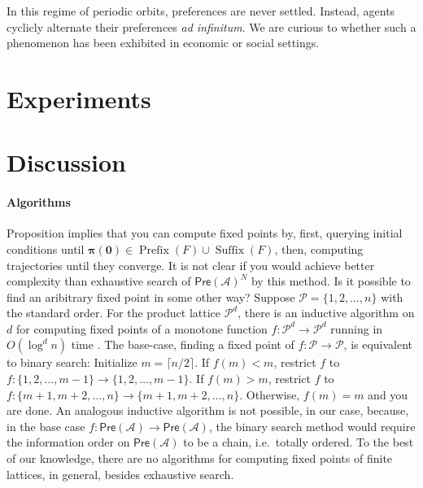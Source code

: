 \documentclass[conference]{ieeeconf}
\newcommand{\A}{\mathcal{A}}
\renewcommand{\P}{\mathcal{P}}
\newcommand{\Pref}{\mathsf{Pre}}
\DeclareMathOperator{\Pre}{Prefix}
\DeclareMathOperator{\Post}{Suffix}
\begin{document}
In this regime of periodic orbits, preferences are never settled. Instead, agents cyclicly alternate their preferences \emph{ad infinitum}. We are curious to whether such a phenomenon has been exhibited in economic or social settings.


\section{Experiments}
\label{sec:experiments}


\section{Discussion}
\label{sec:discussion}

\paragraph*{Algorithms}
Proposition \label{prop:initial-conditions} implies that you can compute fixed points by, first, querying initial conditions until $\boldsymbol{\pi(0)} \in \Pre(F) \cup \Post(F)$, then, computing trajectories until they converge. It is not clear if you would achieve better complexity than exhaustive search of $\Pref(\A)^N$ by this method. Is it possible to find an aribitrary fixed point in some other way? Suppose $\P = \{1,2,\dots,n\}$ with the standard order. For the product lattice $\P^d$, there is an inductive algorithm on $d$ for computing fixed points of a monotone function $f: \P^d \to \P^d$ running in $O(\log^d n)$ time \cite{?}. The base-case, finding a fixed point of $f: \P \to \P$, is equivalent to binary search: Initialize $m = \lceil n/2 \rceil$. If $f(m) < m$, restrict $f$ to $f: \{1,2,\dots,m-1\} \to \{1,2,\dots,m-1\}$. If $f(m) > m$, restrict $f$ to $f: \{m+1,m+2,\dots,n\} \to \{m+1,m+2,\dots,n\}$. Otherwise, $f(m) = m$ and you are done. An analogous inductive algorithm is not possible, in our case, because, in the base case $f: \Pref(\A) \to \Pref(\A)$, the binary search method would require the information order on $\Pref(\A)$ to be a chain, i.e.~totally ordered. To the best of our knowledge, there are no algorithms for computing fixed points of finite lattices, in general, besides exhaustive search.
\end{document}
